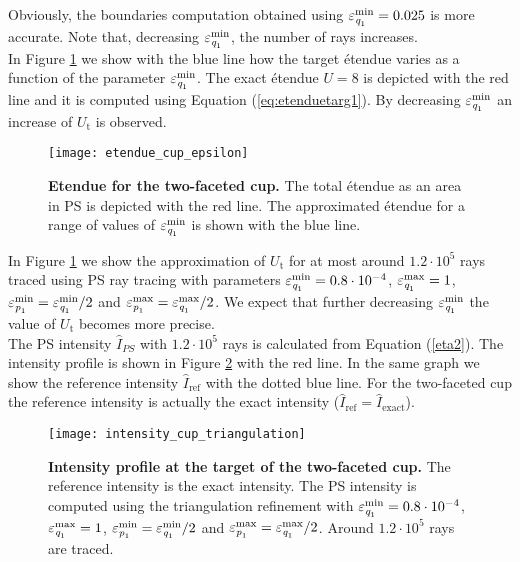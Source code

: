  Obviously, the boundaries computation obtained using $\varepsilon_{\textit{q}_1}^{\textrm{min}} = 0.025$ is more accurate. 
Note that, decreasing $\varepsilon_{\textit{q}_1}^{\textrm{min}}$, the number of rays increases. 
\\ \indent In Figure \ref{fig:etendue_cup} we show with the blue line how the target \'{e}tendue varies as a function of the parameter $\varepsilon_{\textit{q}_1}^{\textrm{min}}$. The exact \'{e}tendue $U=8$ is depicted with the red line and it is computed using Equation (\ref{eq:etenduetarg1}). By decreasing $\varepsilon_{\textit{q}_1}^{\textrm{min}}$ an increase of $U_{\textrm{t}}$ is observed. %
 \begin{figure}[t]
  \center
  \texttt{[image: etendue\_cup\_epsilon]}
  \caption{\textbf{Etendue for the two-faceted cup.} The total \'{e}tendue as an area in PS is depicted with the red line. The approximated \'{e}tendue for a range of values of 
$\varepsilon_{\textit{q}_1}^{\textrm{min}}$ is shown with the blue line.}
  \label{fig:etendue_cup}
\end{figure}
In Figure \ref{fig:etendue_cup} we show the approximation of $U_{\textrm{t}}$ for at most around $1.2 \cdot 10^5$ rays traced using PS ray tracing with parameters $\varepsilon_{\textit{q}_1}^{\textrm{min}}=0.8\cdot 10^{-4}$, $\varepsilon_{\textit{q}_1}^{\textrm{max}}=1$, $\varepsilon_{\textit{p}_1}^{\textrm{min}}=\varepsilon_{\textit{q}_1}^{\textrm{min}}/2$ and $\varepsilon_{\textit{p}_1}^{\textrm{max}}= \varepsilon_{\textit{q}_1}^{\textrm{max}}/2$. We expect that further decreasing $\varepsilon_{\textit{q}_1}^{\textrm{min}}$ the value of $U_{\textrm{t}}$ becomes more precise. 
\\ \indent The PS intensity $\hat{I}_{PS}$ with $1.2 \cdot 10^5$ rays is calculated from Equation (\ref{eta2}). The intensity profile is shown in Figure \ref{fig:intensity_cup_triangulation} with the red line. In the same graph we show the reference intensity $\hat{I}_{\textrm{ref}}$ with the dotted blue line. For the two-faceted cup the reference intensity is actually the exact intensity ($\hat{I}_{\textrm{ref}}= \hat{I}_{\textrm{exact}}$). 
 \begin{figure}[h!]
  \center
  \texttt{[image: intensity\_cup\_triangulation]}
  \caption{\textbf{Intensity profile at the target of the two-faceted cup.} The reference intensity is the exact intensity. The PS intensity is computed using the triangulation refinement with $\varepsilon_{\textit{q}_1}^{\textrm{min}}=0.8\cdot 10^{-4}$, $\varepsilon_{\textit{q}_1}^{\textrm{max}}=1$, $\varepsilon_{\textit{p}_1}^{\textrm{min}}=\varepsilon_{\textit{q}_1}^{\textrm{min}}/2$ and $\varepsilon_{\textit{p}_1}^{\textrm{max}}= \varepsilon_{\textit{q}_1}^{\textrm{max}}/2$. Around $1.2 \cdot 10^5$ rays are traced.}
  \label{fig:intensity_cup_triangulation}
\end{figure}
